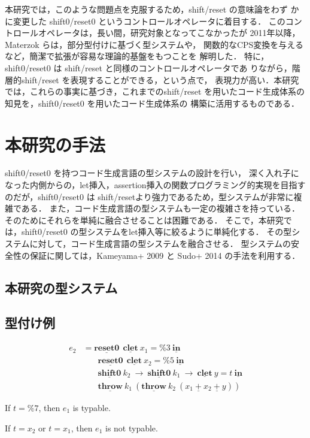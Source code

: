 \documentclass[10pt,a4j,twocolumn]{jarticle}
\newcommand\cResetz{\underline{\textbf{reset0}}}
\newcommand\cShiftz{\underline{\textbf{shift0}}}
\newcommand\cThrow{\underline{\textbf{throw}}}
\newcommand\cPlus{\underline{\textbf{+}}}
\newcommand\cLet{\underline{\textbf{clet}}}
\newcommand\cIn{\underline{\textbf{in}}}
\newcommand\csp[1]{\texttt{\%}{#1}}
\theoremstyle{definition}
\begin{document}
本研究では，このような問題点を克服するため，shift/reset の意味論をわず
かに変更した shift0/reset0 というコントロールオペレータに着目する．
このコントロールオペレータは，長い間，研究対象となってこなかったが
2011年以降，Materzok らは，部分型付けに基づく型システムや，
関数的なCPS変換を与えるなど，簡潔で拡張が容易な理論的基盤をもつことを
解明した\cite{Materzok2011,materzok2012}．
特に，shift0/reset0 は shift/reset と同様のコントロールオペレータであ
りながら，階層的shift/reset を表現することができる，という点で，
表現力が高い．本研究では，これらの事実に基づき，これまでのshift/reset
を用いたコード生成体系の知見を，shift0/reset0 を用いたコード生成体系の
構築に活用するものである．

\section{本研究の手法}
shift0/reset0 を持つコード生成言語の型システムの設計を行い，
深く入れ子になった内側からの，let挿入，assertion挿入の関数プログラミング的実現を目指すのだが，shift0/reset0 は shift/resetより強力であるため，型システムが非常に複雑である．
また，コード生成言語の型システムも一定の複雑さを持っている．
そのためにそれらを単純に融合させることは困難である．
そこで，本研究では，shift0/reset0 の型システムをlet挿入等に絞るように単純化する．
その型システムに対して，コード生成言語の型システムを融合させる．
型システムの安全性の保証に関しては，Kameyama+ 2009\cite{Kameyama2009} と Sudo+ 2014\cite{Sudo2014} の手法を利用する．

\subsection{本研究の型システム}

\subsection{型付け例}
\begin{align*}
  e_2 & = \cResetz ~~\cLet~x_1=\csp{3}~\cIn \\
      & \phantom{=}~~ \cResetz ~~\cLet~x_2=\csp{5}~\cIn \\
      & \phantom{=}~~ \cShiftz~k_2~\to~ \cShiftz~k_1~\to~ \cLet~y=t~\cIn \\
      & \phantom{=}~~ \cThrow~k_1~(\cThrow~k_2~(x_1~\cPlus~x_2~\cPlus~y))
\end{align*}

If $t=\csp{7}$, then $e_1$ is typable.

If $t=x_2$ or $t=x_1$, then $e_1$ is not typable.
\end{document}

